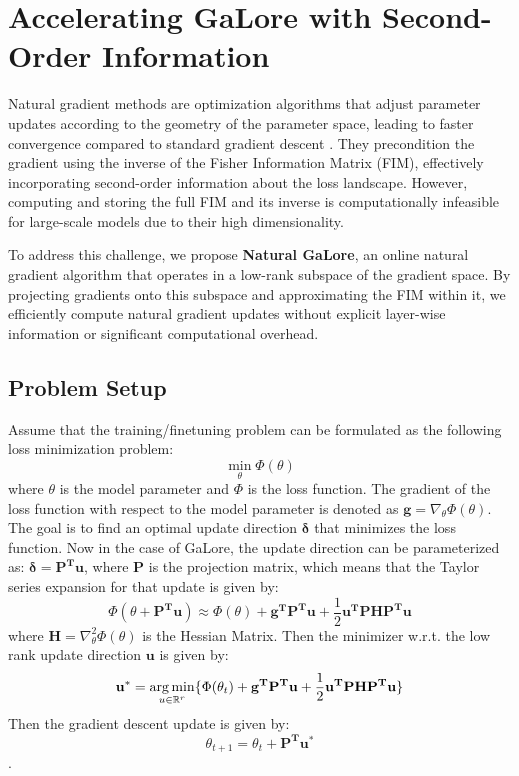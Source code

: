 \def\cG{\mathcal{G}}
\def\rr{\mathbb{R}}

\section{Accelerating GaLore with Second-Order Information}

Natural gradient methods are optimization algorithms that adjust parameter updates according to the geometry of the parameter space, leading to faster convergence compared to standard gradient descent \citep{amariNaturalGradientWorks1998}. They precondition the gradient using the inverse of the Fisher Information Matrix (FIM), effectively incorporating second-order information about the loss landscape. However, computing and storing the full FIM and its inverse is computationally infeasible for large-scale models due to their high dimensionality.

To address this challenge, we propose \textbf{Natural GaLore}, an online natural gradient algorithm that operates in a low-rank subspace of the gradient space. By projecting gradients onto this subspace and approximating the FIM within it, we efficiently compute natural gradient updates without explicit layer-wise information or significant computational overhead.

\subsection{Problem Setup}

Assume that the training/finetuning problem can be formulated as the following loss minimization problem: $$\min_{\theta} \Phi(\theta)$$ where $\theta$ is the model parameter and $\Phi$ is the loss function. The gradient of the loss function with respect to the model parameter is denoted as $\mathbf{g} = \nabla_{\theta} \Phi(\theta)$. The goal is to find an optimal update direction $\mathbf{\delta}$ that minimizes the loss function. Now in the case of GaLore, the update direction can be parameterized as: $\mathbf{\delta} = \mathbf{P^T u}$, where $\mathbf{P}$ is the projection matrix, which means that the Taylor series expansion for that update is given by: $$\Phi(\theta + \mathbf{P^T u}) \approx \Phi(\theta) + \mathbf{g^T P^T u} + \frac{1}{2} \mathbf{u^T PHP^T  u}$$ where $\mathbf{H} = \nabla^2_{\theta} \Phi(\theta)$ is the Hessian Matrix. Then the minimizer w.r.t. the low rank update direction $\mathbf{u}$ is given by: $$\mathbf{u^*} = \operatorname*{arg\,min}_{u\in \mathbb{R}^r} \{\Phi(\theta_t) + \mathbf{g^T P^T u} + \frac{1}{2} \mathbf{u^T PHP^T  u}\}$$ Then the gradient descent update is given by: $$\theta_{t+1} = \theta_t + \mathbf{P^T u^*}$$.

